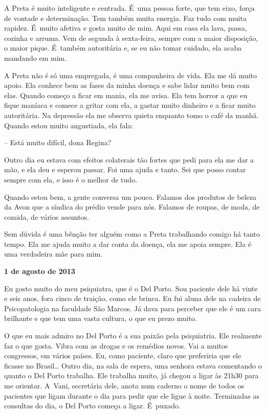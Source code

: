 A Preta é muito inteligente e centrada. É~uma pessoa forte, que tem
eixo, força de vontade e determinação. Tem também muita energia. Faz
tudo com muita rapidez. É~muito afetiva e gosta muito de mim. Aqui em
casa ela lava, passa, cozinha e arruma. Vem de segunda à sexta-feira,
sempre com a maior disposição, o maior pique. É~também autoritária e, se
eu não tomar cuidado, ela acaba mandando em mim.

A Preta não é só uma empregada, é uma companheira de vida. Ela me dá
muito apoio. Ela conhece bem as fases da minha doença e sabe lidar muito
bem com elas. Quando começo a ficar em mania, ela me avisa. Ela tem
horror a que eu fique maníaca e comece a gritar com ela, a gastar muito
dinheiro e a ficar muito autoritária. Na depressão ela me observa
quieta enquanto tomo o café da manhã. Quando estou muito angustiada, ela
fala:

-- Está muito difícil, dona Regina?

Outro dia eu estava com efeitos colaterais tão fortes que pedi para ela
me dar a mão, e ela deu e esperou passar. Foi uma ajuda e tanto. Sei que
posso contar sempre com ela, e isso é o melhor de tudo.

Quando estou bem, a gente conversa um pouco. Falamos dos produtos de
beleza da Avon que a síndica do prédio vende para nós. Falamos de
roupas, de moda, de comida, de vários assuntos.

Sem dúvida é uma bênção ter alguém como a Preta trabalhando comigo há
tanto tempo. Ela me ajuda muito a dar conta da doença, ela me apoia
sempre. Ela é uma verdadeira mãe para mim.

\begin{center}\asterisc{}\end{center}

\begin{flushright}\textbf{1 de agosto de 2013}\end{flushright}


Eu gosto muito do meu psiquiatra, que é o Del Porto. Sou paciente dele
há vinte e seis anos, fora cinco de traição, como ele brinca. Eu fui
aluna dele na cadeira de Psicopatologia na faculdade São Marcos. Já dava
para perceber que ele é um cara brilhante e que tem uma vasta cultura, o
que eu prezo muito.

O que eu mais admiro no Del Porto é a sua paixão pela psiquiatria. Ele
realmente faz o que gosta. Vibra com as drogas e os remédios novos. Vai
a muitos congressos, em vários países. Eu, como paciente, claro que
preferiria que ele ficasse no Brasil… Outro dia, na sala de
espera, uma senhora estava comentando o quanto o Del Porto trabalha. Ele
trabalha muito, já chegou a ligar às 21h30 para me orientar. A~Vani,
secretária dele, anota num caderno o nome de todos os pacientes que
ligam durante o dia para pedir que ele ligue à noite. Terminadas as
consultas do dia, o Del Porto começa a ligar. É~puxado.

